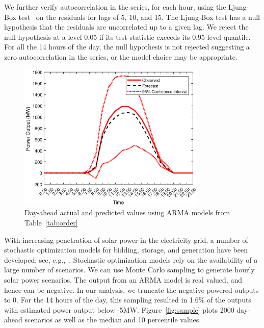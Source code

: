 \documentclass[review]{elsarticle}
\begin{document}
We further verify autocorrelation in the series, for each hour, using the 
Ljung-Box test~\cite{ljung1978measure} on the residuals for lags of 5, 10, 
and 15. The Ljung-Box  test has a 
null hypothesis that the residuals are uncorrelated up to a 
given lag. We reject the null hypothesis at a level 0.05 if its test-statistic 
exceeds its 
0.95 level quantile. For all the 14 hours of the day, the null hypothesis is not
rejected suggesting a zero autocorrelation in the series, or the 
model choice may be appropriate. 


\begin{figure}[!t]
\centering
\includegraphics[width=0.8\textwidth]{prediction.eps}
\caption{Day-ahead actual and predicted values using ARMA models from 
Table~\ref{tab:order}}
 \label{fig:prediction}
\end{figure}

With increasing penetration of solar power in the electricity grid, a number of 
stochastic optimization models for bidding, storage, and generation have been 
developed; see, e.g.,~\cite{banos2011optimization,sharma2012stochastic}. 
Stochastic optimization models rely on the availability of a large number of 
scenarios.  We can use Monte Carlo sampling to generate hourly solar power 
scenarios. The output from an ARMA model is real valued, and hence can be 
negative. In our analysis, we truncate the negative powered outputs to 0. For 
the 14 hours of 
the day, this sampling resulted in 1.6\% of the outputs with estimated power 
output below -5MW. Figure~\ref{fig:sample} plots 2000 day-ahead scenarios 
as well as the median and 10 percentile values. 
\end{document}
